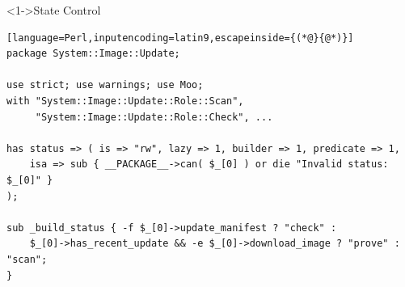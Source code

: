 \documentclass[ngerman,xcolor={table,dvipsnames},smaller,compress,hyperref={bookmarks,colorlinks}]{beamer}%
\begin{document}
\begin{frame}[t,fragile]

\begin{block}<1->{State Control}
\scriptsize
\begin{lstlisting}[language=Perl,inputencoding=latin9,escapeinside={(*@}{@*)}]
package System::Image::Update;

use strict; use warnings; use Moo;
with "System::Image::Update::Role::Scan",
     "System::Image::Update::Role::Check", ...

has status => ( is => "rw", lazy => 1, builder => 1, predicate => 1,
    isa => sub { __PACKAGE__->can( $_[0] ) or die "Invalid status: $_[0]" }
);

sub _build_status { -f $_[0]->update_manifest ? "check" :
    $_[0]->has_recent_update && -e $_[0]->download_image ? "prove" : "scan";
}
\end{lstlisting}
\end{block}

\begin{itemize}
\end{itemize}

\end{frame}
\end{document}
